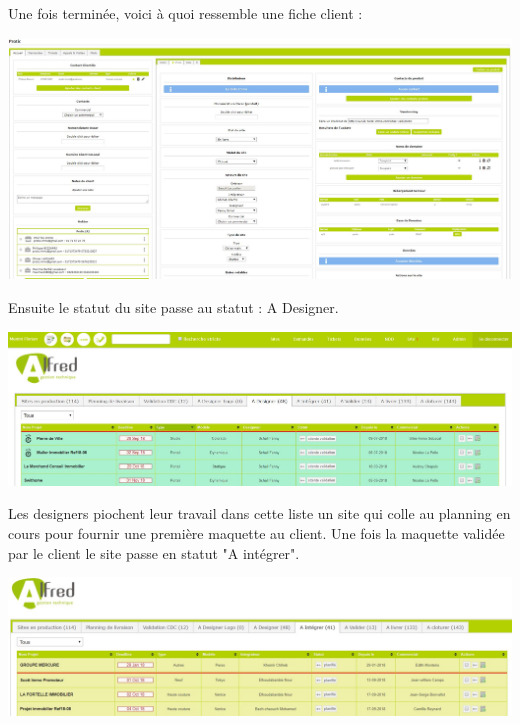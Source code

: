 \documentclass[12pt]{article}
\begin{document}
Une fois terminée, voici à quoi ressemble une fiche client :
\begin{center} 
\includegraphics[scale = 0.3]{FicheClient1.JPG}
\end{center}

\vspace{0.5cm}

Ensuite le statut du site passe au statut : A Designer.

\begin{center} \includegraphics[scale = 0.3]{A_designer.JPG} \end{center}

Les designers piochent leur travail dans cette liste un site qui colle au planning en cours pour fournir une première maquette au client.
Une fois la maquette validée par le client le site passe en statut "A intégrer".

\vspace{0.3cm}

\begin{center} \includegraphics[scale = 0.3]{A_integrer.JPG} \end{center}
\end{document}
